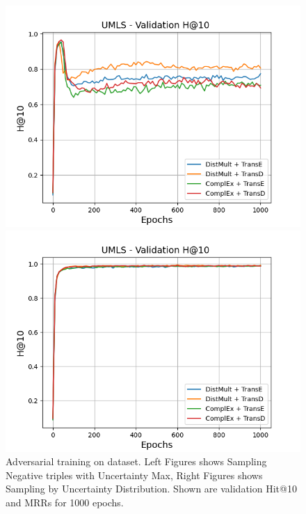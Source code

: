 \begin{figure}
\begin{minipage}{.5\textwidth}
    \end{minipage}
    \begin{minipage}{.5\textwidth}
      \centering
      \includegraphics[width=0.9\linewidth]{figures/results/gan_train/not_pretrained/uncertainty/max/entropy/umls/1k_epochs/uncertainty_umls_hit10.png}
    \end{minipage}%
    \begin{minipage}{.5\textwidth}
      \centering
      \includegraphics[width=0.9\linewidth]{figures/results/gan_train/not_pretrained/uncertainty/max_distribution/entropy/umls/1k_epochs/uncertainty_umls_hit10.png}
    \end{minipage}%
    \caption{Adversarial training on \umls dataset. 
    Left Figures shows Sampling Negative triples with Uncertainty Max, Right Figures shows Sampling by Uncertainty Distribution.
    Shown are validation Hit@10 and MRRs for 1000 epochs.}
    \label{fig:advtrain_umls_usmax_ussoftmax}
\end{figure}
